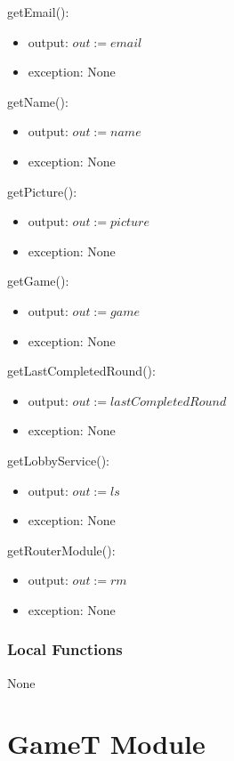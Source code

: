 \documentclass[12pt, titlepage]{article}
\begin{document}
\noindent getEmail():
\begin{itemize}
\item output: $out := email$
\item exception: None
\end{itemize}

\noindent getName():
\begin{itemize}
\item output: $out := name$
\item exception: None
\end{itemize}

\noindent getPicture():
\begin{itemize}
\item output: $out := picture$
\item exception: None
\end{itemize}

\noindent getGame():
\begin{itemize}
\item output: $out := game$
\item exception: None
\end{itemize}

\noindent getLastCompletedRound():
\begin{itemize}
\item output: $out := lastCompletedRound$
\item exception: None
\end{itemize}

\noindent getLobbyService():
\begin{itemize}
\item output: $out := ls$
\item exception: None
\end{itemize}

\noindent getRouterModule():
\begin{itemize}
\item output: $out := rm$
\item exception: None
\end{itemize}

\subsubsection{Local Functions}
None

\newpage

\section{GameT Module} \label{GameT}
\end{document}
